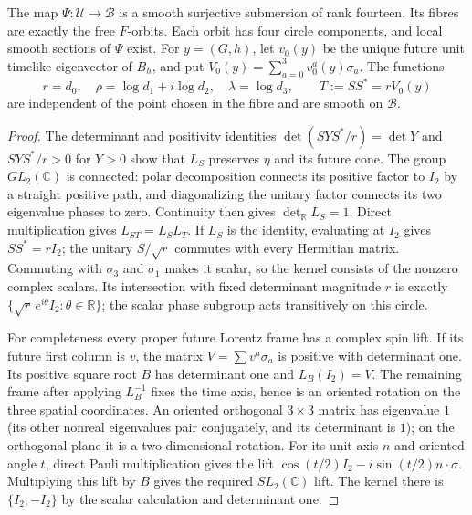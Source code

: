 \begin{proposition}\label{rm:fibre}
The map $\Psi:\mathcal U\to\mathcal B$ is a smooth surjective submersion
of rank fourteen. Its fibres are exactly the free $F$-orbits. Each orbit
has four circle components, and local smooth sections of $\Psi$ exist.
For $y=(G,h)$, let $v_0(y)$ be the unique future unit timelike eigenvector
of $B_h$, and put $V_0(y)=\sum_{a=0}^3v_0^a(y)\sigma_a$. The functions
\begin{equation}\label{rm:target-recovery}
 r=d_0,\quad\rho=\log d_1+i\log d_2,\quad
 \lambda=\log d_3,\qquad T:=SS^*=rV_0(y)
\end{equation}
are independent of the point chosen in the fibre and are smooth on
$\mathcal B$.
\end{proposition}
\begin{proof}
The determinant and positivity identities
$\det(SYS^*/r)=\det Y$ and $SYS^*/r>0$ for $Y>0$ show that $L_S$
preserves $\eta$ and its future cone. The group $GL_2(\mathbb C)$ is
connected: polar decomposition connects its positive factor to $I_2$
by a straight positive path, and diagonalizing the unitary factor
connects its two eigenvalue phases to zero. Continuity then gives
$\det_{\mathbb R}L_S=1$. Direct multiplication gives $L_{ST}=L_SL_T$.
If $L_S$ is the identity, evaluating at $I_2$ gives $SS^*=rI_2$;
the unitary $S/\sqrt r$ commutes with every Hermitian matrix. Commuting
with $\sigma_3$ and $\sigma_1$ makes it scalar, so the kernel consists
of the nonzero complex scalars. Its intersection with fixed determinant
magnitude $r$ is exactly $\{\sqrt r\,e^{i\theta}I_2:\theta\in\mathbb R\}$;
the scalar phase subgroup acts transitively on this circle.

For completeness every proper future Lorentz frame has a complex spin
lift. If its future first column is $v$, the matrix
$V=\sum v^a\sigma_a$ is positive with determinant one. Its positive
square root $B$ has determinant one and $L_B(I_2)=V$. The remaining
frame after applying $L_B^{-1}$ fixes the time axis, hence is an
oriented rotation on the three spatial coordinates. An oriented
orthogonal $3\times3$ matrix has eigenvalue $1$ (its other nonreal
eigenvalues pair conjugately, and its determinant is $1$); on the
orthogonal plane it is a two-dimensional rotation. For its unit axis
$n$ and oriented angle $t$, direct Pauli multiplication gives the lift
$\cos(t/2)I_2-i\sin(t/2)n\cdot\sigma$. Multiplying this lift by $B$
gives the required $SL_2(\mathbb C)$ lift. The kernel there is
$\{I_2,-I_2\}$ by the scalar calculation and determinant one.


\end{proof}
